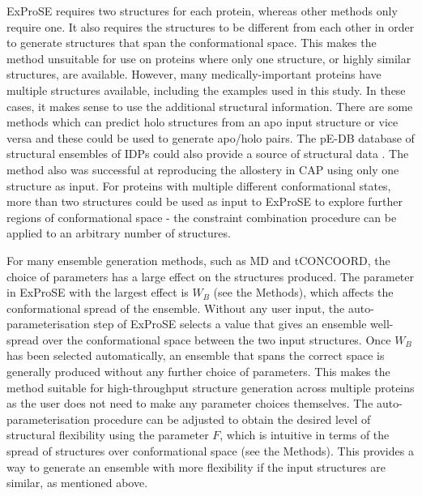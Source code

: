 ExProSE requires two structures for each protein, whereas other methods only require one.
It also requires the structures to be different from each other in order to generate structures that span the conformational space.
This makes the method unsuitable for use on proteins where only one structure, or highly similar structures, are available.
However, many medically-important proteins have multiple structures available, including the examples used in this study.
In these cases, it makes sense to use the additional structural information.
There are some methods which can predict holo structures from an apo input structure or vice versa \cite{Seeliger2010, Grove2013, Kidd2009} and these could be used to generate apo/holo pairs.
The pE-DB database of structural ensembles of IDPs could also provide a source of structural data \cite{Varadi2014}.
The method also was successful at reproducing the allostery in CAP using only one structure as input.
For proteins with multiple different conformational states, more than two structures could be used as input to ExProSE to explore further regions of conformational space - the constraint combination procedure can be applied to an arbitrary number of structures.

For many ensemble generation methods, such as MD and tCONCOORD, the choice of parameters has a large effect on the structures produced.
The parameter in ExProSE with the largest effect is $W_{B}$ (see the Methods), which affects the conformational spread of the ensemble.
Without any user input, the auto-parameterisation step of ExProSE selects a value that gives an ensemble well-spread over the conformational space between the two input structures.
Once $W_{B}$ has been selected automatically, an ensemble that spans the correct space is generally produced without any further choice of parameters.
This makes the method suitable for high-throughput structure generation across multiple proteins as the user does not need to make any parameter choices themselves.
The auto-parameterisation procedure can be adjusted to obtain the desired level of structural flexibility using the parameter $F$, which is intuitive in terms of the spread of structures over conformational space (see the Methods).
This provides a way to generate an ensemble with more flexibility if the input structures are similar, as mentioned above.

